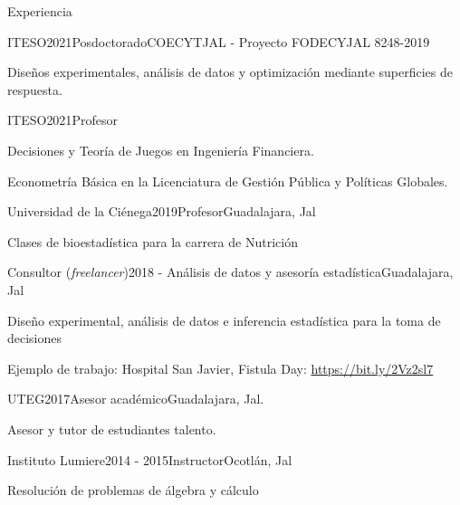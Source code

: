 \documentclass{resume} %
\begin{document}
\begin{rSection}{Experiencia}

\begin{rSubsection}{ITESO}{2021}{Posdoctorado}{COECYTJAL - Proyecto FODECYJAL 8248-2019}
\item Diseños experimentales, análisis de datos y optimización mediante superficies de respuesta.
\end{rSubsection}

\begin{rSubsection}{ITESO}{2021}{Profesor}{}
    \item Decisiones y Teoría de Juegos en Ingeniería Financiera.
    \item Econometría Básica en la Licenciatura de Gestión Pública y Políticas Globales.
\end{rSubsection}

\begin{rSubsection}{Universidad de la Ciénega}{2019}{Profesor}{Guadalajara, Jal}
\item Clases de bioestadística para la carrera de Nutrición
\end{rSubsection}

\begin{rSubsection}{Consultor ({\em freelancer})}{2018 - }{Análisis de datos y asesoría estadística}{Guadalajara, Jal}
\item Diseño experimental, análisis de datos e inferencia estadística para la toma de decisiones
\item Ejemplo de trabajo: Hospital San Javier, Fistula Day:  \url{https://bit.ly/2Vz2sl7}
\end{rSubsection}

\begin{rSubsection}{UTEG}{2017}{Asesor académico}{Guadalajara, Jal.}
	\item Asesor y tutor de estudiantes talento.
\end{rSubsection}


\begin{rSubsection}{Instituto Lumiere}{2014 - 2015}{Instructor}{Ocotlán, Jal}
	\item Resolución de problemas de álgebra y cálculo
\end{rSubsection}

\end{rSection}
\end{document}
